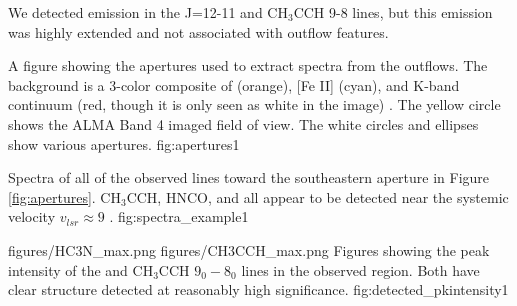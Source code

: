 \documentclass[twocolumn]{aastex61}
\begin{document}
We detected emission in the \cyanoacetylene J=12-11 and CH$_3$CCH 9-8 lines,
but this emission was highly extended and not associated with outflow features.


{A figure showing the apertures used to extract spectra from the outflows.
The background is a 3-color composite of \hh (orange), [Fe II] (cyan), and
K-band continuum (red, though it is only seen as white in the image)
\citep{Bally2015a,Bally2017a}.
The yellow circle shows the ALMA Band 4 imaged field of view.  The white
circles and ellipses show various apertures.
}{fig:apertures}{1}{\textwidth}

{Spectra of all of the observed lines toward the southeastern aperture in
Figure \ref{fig:apertures}.  CH$_3$CCH, HNCO, and \cyanoacetylene all appear to
be detected near the systemic velocity $v_{lsr}\approx9$ \kms.}
{fig:spectra_example}{1}{\textwidth}

\FigureTwo
{figures/HC3N_max.png}
{figures/CH3CCH_max.png}
{Figures showing the peak intensity of the \cyanoacetylene and CH$_3$CCH $9_0-8_0$ lines
in the observed region.  Both have clear structure detected at reasonably high significance.}
{fig:detected_pkintensity}{1}{\textwidth}
\end{document}
